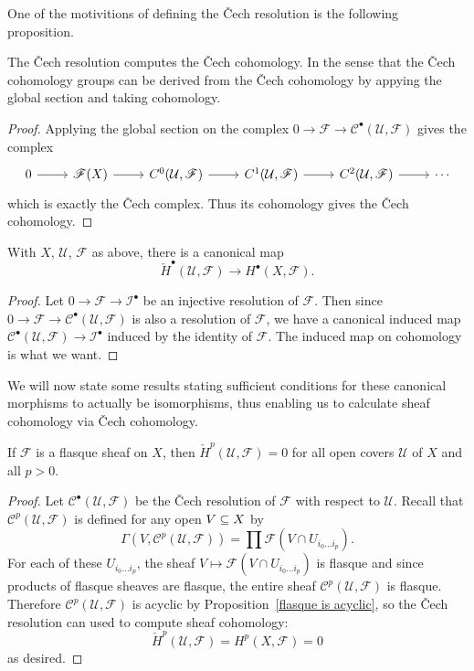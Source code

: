 One of the motivitions of defining the \v{C}ech resolution is the following proposition.
\begin{proposition}
The \v{C}ech resolution computes the \v{C}ech cohomology. In the sense that the \v{C}ech cohomology groups can be derived from the \v{C}ech cohomology by appying the global section and taking cohomology.
\end{proposition}
\begin{proof}
Applying the global section on the complex $0\to\mathscr{F}\to\mathscr{C}^\bullet(\mathcal{U},\mathscr{F})$ gives the complex
\[\begin{tikzcd}
0\ar[r]&\mathscr{F}(X)\ar[r]&C^0(\mathcal{U},\mathscr{F})\ar[r]&C^1(\mathcal{U},\mathscr{F})\ar[r]&C^2(\mathcal{U},\mathscr{F})\ar[r]&\cdots
\end{tikzcd}\]
which is exactly the \v{C}ech complex. Thus its cohomology gives the \v{C}ech cohomology.
\end{proof}
\begin{corollary}
With $X$, $\mathcal{U}$, $\mathscr{F}$ as above, there is a canonical map
\[\check{H}^\bullet(\mathcal{U},\mathscr{F})\to H^\bullet(X,\mathscr{F}).\]
\end{corollary}
\begin{proof}
Let $0\to\mathscr{F}\to\mathscr{I}^\bullet$ be an injective resolution of $\mathscr{F}$. Then since $0\to\mathscr{F}\to\mathscr{C}^\bullet(\mathcal{U},\mathscr{F})$ is also a resolution of $\mathscr{F}$, we have a canonical induced map $\mathscr{C}^\bullet(\mathcal{U},\mathscr{F})\to\mathscr{I}^\bullet$ induced by the identity of $\mathscr{F}$. The induced map on cohomology is what we want.
\end{proof}
We will now state some results stating sufficient conditions for these
canonical morphisms to actually be isomorphisms, thus enabling us to calculate sheaf cohomology via \v{C}ech cohomology.
\begin{proposition}\label{Cech flasque}
If $\mathscr{F}$ is a flasque sheaf on $X$, then $\check{H}^p(\mathcal{U},\mathscr{F})=0$ for all open covers $\mathcal{U}$ of $X$ and all $p>0$.
\end{proposition}
\begin{proof}
Let $\mathscr{C}^\bullet(\mathcal{U},\mathscr{F})$ be the \v{C}ech resolution of $\mathscr{F}$ with respect to $\mathcal{U}$. Recall that $\mathscr{C}^p(\mathcal{U},\mathscr{F})$ is defined for any open $V\subseteq X$ by
\[\Gamma(V,\mathscr{C}^p(\mathcal{U},\mathscr{F}))=\prod\mathscr{F}(V\cap U_{i_0\dots i_p}).\]
For each of these $U_{i_0\dots i_p}$, the sheaf $V\mapsto\mathscr{F}(V\cap U_{i_0\dots i_p})$ is flasque and since products of flasque sheaves are flasque, the entire sheaf $\mathscr{C}^p(\mathcal{U},\mathscr{F})$ is flasque. Therefore $\mathscr{C}^p(\mathcal{U},\mathscr{F})$ is acyclic by Proposition~\ref{flasque is acyclic}, so the \v{C}ech resolution can used to compute sheaf cohomology:
\[\check{H}^p(\mathcal{U},\mathscr{F})=H^p(X,\mathscr{F})=0\]
as desired.
\end{proof}
